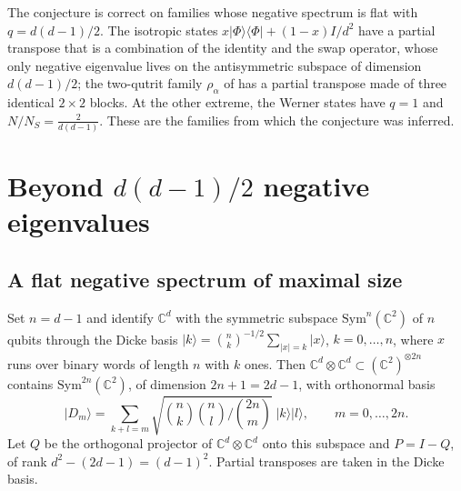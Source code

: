 \documentclass[11pt,a4paper]{article}
\theoremstyle{definition}
\theoremstyle{plain}
\newcommand{\ket}[1]{\lvert#1\rangle}
\newcommand{\ketbra}[2]{\lvert#1\rangle\langle#2\rvert}
\newcommand{\C}{\mathbb{C}}
\newcommand{\NS}{N_{S}}
\begin{document}
The conjecture is correct on families whose negative spectrum is flat with
$q=d(d-1)/2$. The isotropic states $x\ketbra\Phi\Phi+(1-x)I/d^2$ have a partial
transpose that is a combination of the identity and the swap operator, whose
only negative eigenvalue lives on the antisymmetric subspace of dimension
$d(d-1)/2$; the two-qutrit family $\rho_\alpha$ of \cite{KumariAdhikari2022}
has a partial transpose made of three identical $2\times2$ blocks. At the
other extreme, the Werner states have $q=1$ and $N/\NS=\frac{2}{d(d-1)}$.
These are the families from which the conjecture was inferred.

\section{Beyond \texorpdfstring{$d(d-1)/2$}{d(d-1)/2} negative eigenvalues}\label{sec:beyond}
\subsection{A flat negative spectrum of maximal size}
Set $n=d-1$ and identify $\C^d$ with the symmetric subspace
$\mathrm{Sym}^n(\C^2)$ of $n$ qubits through the Dicke basis
$\ket{k}=\binom nk^{-1/2}\sum_{\lvert x\rvert=k}\ket{x}$, $k=0,\dots,n$, where
$x$ runs over binary words of length $n$ with $k$ ones. Then
$\C^d\otimes\C^d\subset(\C^2)^{\otimes2n}$ contains $\mathrm{Sym}^{2n}(\C^2)$, of
dimension $2n+1=2d-1$, with orthonormal basis
\begin{equation}\label{eq:Dm}
\ket{D_m}=\sum_{k+l=m}\sqrt{\binom nk\binom nl\Big/\binom{2n}{m}}\;\ket{k}\ket{l},
\qquad m=0,\dots,2n .
\end{equation}
Let $Q$ be the orthogonal projector of $\C^d\otimes\C^d$ onto this subspace and
$P=I-Q$, of rank $d^2-(2d-1)=(d-1)^2$. Partial transposes are taken in the
Dicke basis.
\end{document}
